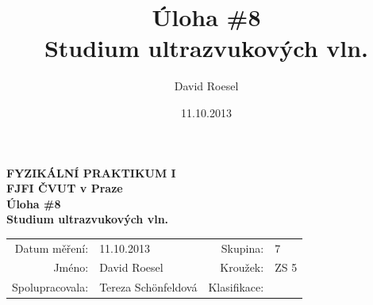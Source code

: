 \documentclass[english]{article}
\newcommand{\Author}{David Roesel}
\newcommand{\Coauthor}{Tereza Schönfeldová}
\newcommand{\Institute}{FJFI ČVUT v Praze}
\newcommand{\Subject}{FYZIKÁLNÍ PRAKTIKUM I}
\newcommand{\Group}{7}
\newcommand{\Circle}{ZS 5}
\newcommand{\Title}{Úloha \#8 \\Studium ultrazvukových vln.}
\newcommand{\Date}{11.10.2013}
\begin{document}
\author{\Author}
\title{\Title}
\date{\Date}

\renewcommand{\figurename}{Obr.}
\renewcommand{\tablename}{Tab.}
\renewcommand{\refname}{Reference}


\setlength{\parindent}{0cm}
\begin{multicols}{2}
\textbf{\Subject \\
        \Institute \\[0.1cm]
\large  \Title \\[0.5cm]
}
\begin{tabular}{rlrl}
\large Datum měření: & \Date & \large Skupina: & \Group \\
\large Jméno: & \Author & \large Kroužek:  & \Circle\\
\large Spolupracovala: & \Coauthor &\large Klasifikace:\\
\end{tabular}


\end{multicols}
\end{document}
